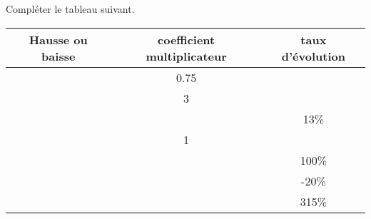 
\begin{exercice}\label{exosmath-0101}

    Compléter le tableau suivant.

    \begin{center}
    \begin{tabular}[]{|c||c|c|}
        \hline
        Hausse ou baisse&coefficient multiplicateur&taux d'évolution\\
        \hline\hline
        &0.75&\\
        \hline
        &3&\\
        \hline
        &&13\%\\
        \hline
        &1&\\
        \hline
        &&100\%\\
        \hline
        &&-20\%\\
        \hline
        &&315\%\\
        \hline
    \end{tabular}
        
    \end{center}
    

\end{exercice}
